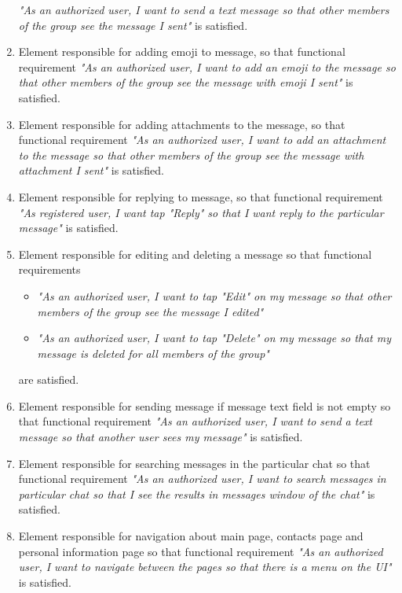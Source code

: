 \begin{enumerate}
    \textit{"As an authorized user, I want to send a text message so that other members of the group see the message I sent"}
    is satisfied.
    \item Element responsible for adding emoji to message, so that functional requirement
    \textit{"As an authorized user, I want to add an emoji to the message so that other members of the group
    see the message with emoji I sent"} is satisfied.
    \item Element responsible for adding attachments to the message, so that functional requirement
    \textit{"As an authorized user, I want to add an attachment to the message so that other members of the group see the
    message with attachment I sent"} is satisfied.
    \item Element responsible for replying to message, so that functional requirement
    \textit{"As registered user, I want tap "Reply" so that I want reply to the particular message"} is satisfied.
    \item Element responsible for editing and deleting a message so that functional requirements
    \begin{itemize}
        \item \textit{"As an authorized user, I want to tap "Edit" on my message so that other members of the group
        see the message I edited"}
        \item \textit{"As an authorized user, I want to tap "Delete" on my message so that my message is deleted for
        all members of the group"}
    \end{itemize}
    are satisfied.
    \item Element responsible for sending message if message text field is not empty so that functional requirement
    \textit{"As an authorized user, I want to send a text message so that another user sees my message"}
    is satisfied.
    \item Element responsible for searching messages in the particular chat so that functional requirement
    \textit{"As an authorized user, I want to search messages in particular chat so that I see the results in
    messages window of the chat"} is satisfied.
    \item Element responsible for navigation about main page, contacts page and personal information page so that
    functional requirement
    \textit{"As an authorized user, I want to navigate between the pages so that there is a menu on the UI"} is satisfied.
\end{enumerate}

